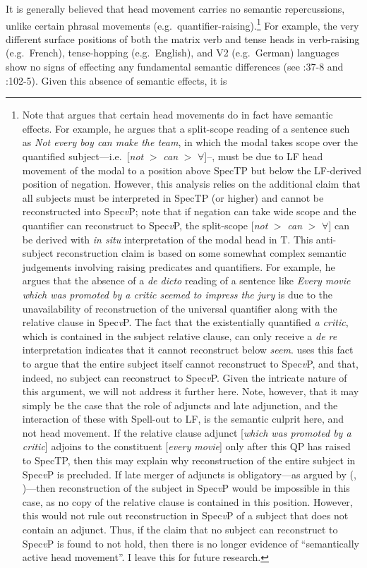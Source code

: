 It is generally believed that head movement carries no semantic repercussions, unlike certain phrasal movements (e.g.\ quantifier-raising).\footnote{Note that \citet{lechner2006} argues that certain head movements do in fact have semantic effects. For example, he argues that a split-scope reading of a sentence such as {\it Not every boy can make the team}, in which the modal takes scope over the quantified subject---i.e.\ [{\it not} $>$ {\it can} $>$ $\forall$]--, must be due to LF head movement of the modal to a position above SpecTP but below the LF-derived position of negation. However, this analysis relies on the additional claim that all subjects must be interpreted in SpecTP (or higher) and cannot be reconstructed into Spec{\it v}P; note that if negation can take wide scope and the quantifier can reconstruct to Spec{\it v}P, the split-scope [{\it not} $>$ {\it can} $>$ $\forall$] can be derived with {\it in situ} interpretation of the modal head in T. This anti-subject reconstruction claim is based on some somewhat complex semantic judgements involving raising predicates and quantifiers. For example, he argues that the absence of a {\it de dicto} reading of a sentence like {\it Every movie which was promoted by a critic seemed to impress the jury} is due to the unavailability of reconstruction of the universal quantifier along with the relative clause in Spec{\it v}P. The fact that the existentially quantified {\it a critic}, which is contained in the subject relative clause, can only receive a {\it de re} interpretation indicates that it cannot reconstruct below {\it seem}. \citeauthor{lechner2006} uses this fact to argue that the entire subject itself cannot reconstruct to Spec{\it v}P, and that, indeed, no subject can reconstruct to Spec{\it v}P. Given the intricate nature of this argument, we will not address it further here. Note, however, that it may simply be the case that the role of adjuncts and late adjunction, and the interaction of these with Spell-out to LF, is the semantic culprit here, and not head movement. If the relative clause adjunct [{\it which was promoted by a critic}] adjoins to the constituent [{\it every movie}] only after this QP has raised to SpecTP, then this may explain why reconstruction of the entire subject in Spec{\it v}P is precluded. If late merger of adjuncts is obligatory---as argued by \citeauthor{stepanov2000} (\citeyear{stepanov2000}, \citeyear{stepanov2001})---then reconstruction of the subject in Spec{\it v}P would be impossible in this case, as no copy of the relative clause is contained in this position. However, this would not rule out reconstruction in Spec{\it v}P of a subject that does not contain an adjunct. Thus, if the claim that no subject can reconstruct to Spec{\it v}P is found to not hold, then there is no longer evidence of ``semantically active head movement''. I leave this for future research.} For example, the very different surface positions of both the matrix verb and tense heads in verb-raising (e.g.\ French), tense-hopping (e.g.\ English), and V2 (e.g.\ German) languages show no signs of effecting any fundamental semantic differences (see \citeauthor{chomsky2001} \citeyear{chomsky2001}:37-8 and \citeauthor{matushansky2006} \citeyear{matushansky2006}:102-5). Given this absence of semantic effects, it is 